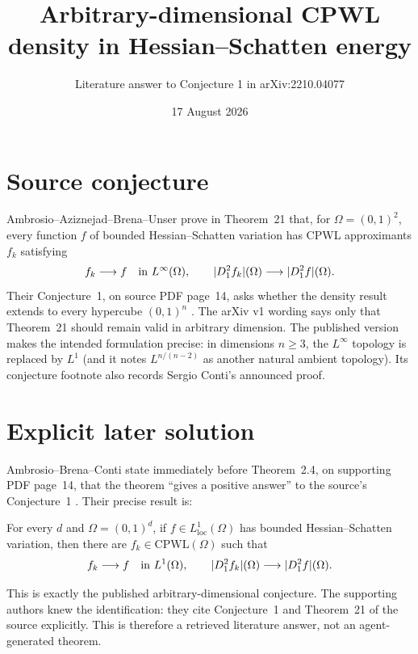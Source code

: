 \documentclass[11pt]{article}
\title{Arbitrary-dimensional CPWL density in Hessian--Schatten energy}
\author{Literature answer to Conjecture 1 in arXiv:2210.04077}
\date{17 August 2026}
\begin{document}
\maketitle

\begin{center}
\end{center}

\section*{Source conjecture}
Ambrosio--Aziznejad--Brena--Unser prove in Theorem~21 that, for
$\Omega=(0,1)^2$, every function $f$ of bounded Hessian--Schatten variation
has CPWL approximants $f_k$ satisfying
\[
 f_k\longrightarrow f \quad\hbox{in }L^\infty(\Omega),
 \qquad
 |D_1^2 f_k|(\Omega)\longrightarrow |D_1^2 f|(\Omega).
\]
Their Conjecture~1, on source PDF page~14, asks whether the density result
extends to every hypercube $(0,1)^n$ \cite{AABU}.  The arXiv v1 wording says
only that Theorem~21 should remain valid in arbitrary dimension.  The
published version makes the intended formulation precise: in dimensions
$n\geq3$, the $L^\infty$ topology is replaced by $L^1$ (and it notes
$L^{n/(n-2)}$ as another natural ambient topology).  Its conjecture footnote
also records Sergio Conti's announced proof.

\section*{Explicit later solution}
Ambrosio--Brena--Conti state immediately before Theorem~2.4, on supporting PDF
page~14, that the theorem ``gives a positive answer'' to the source's
Conjecture~1 \cite{ABC}.  Their precise result is:

\medskip
\noindent
For every $d$ and $\Omega=(0,1)^d$, if $f\in L^1_{\mathrm{loc}}(\Omega)$ has
bounded Hessian--Schatten variation, then there are
$f_k\in\mathrm{CPWL}(\Omega)$ such that
\[
 f_k\longrightarrow f \quad\hbox{in }L^1(\Omega),
 \qquad
 |D_1^2 f_k|(\Omega)\longrightarrow |D_1^2 f|(\Omega).
\]

This is exactly the published arbitrary-dimensional conjecture.  The
supporting authors knew the identification: they cite Conjecture~1 and
Theorem~21 of the source explicitly.  This is therefore a retrieved literature
answer, not an agent-generated theorem.
\end{document}
